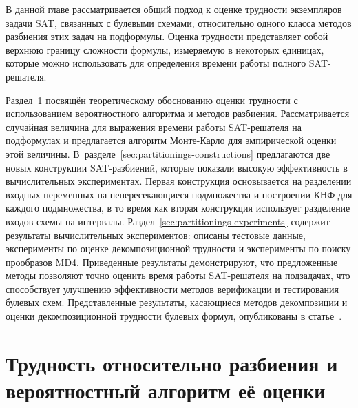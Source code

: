 


В данной главе рассматривается общий подход к оценке трудности экземпляров задачи SAT, связанных с булевыми схемами, относительно одного класса методов разбиения этих задач на подформулы.
Оценка трудности представляет собой верхнюю границу сложности формулы, измеряемую в некоторых единицах, которые можно использовать для определения времени работы полного SAT-решателя.

Раздел~\ref{sec:partitionings-hardness} посвящён теоретическому обоснованию оценки трудности с использованием вероятностного алгоритма и методов разбиения.
Рассматривается случайная величина для выражения времени работы SAT-решателя на подформулах и предлагается алгоритм Монте-Карло для эмпирической оценки этой величины.
В~разделе~\ref{sec:partitionings-constructions} предлагаются две новых конструкции SAT-разбиений, которые показали высокую эффективность в вычислительных экспериментах.
Первая конструкция основывается на разделении входных переменных на непересекающиеся подмножества и построении КНФ для каждого подмножества, в то время как вторая конструкция использует разделение входов схемы на интервалы.
Раздел~\ref{sec:partitionings-experiments} содержит результаты вычислительных экспериментов: описаны тестовые данные, эксперименты по оценке декомпозиционной трудности и эксперименты по поиску прообразов MD4.
Приведенные результаты демонстрируют, что предложенные методы позволяют точно оценить время работы SAT-решателя на подзадачах, что способствует улучшению эффективности методов верификации и тестирования булевых схем.
Представленные результаты, касающиеся методов декомпозиции и оценки декомпозиционной трудности булевых формул, опубликованы в статье~\cite{semenov2022}.


\section{Трудность относительно разбиения и вероятностный алгоритм её оценки}
\label{sec:partitionings-hardness}

